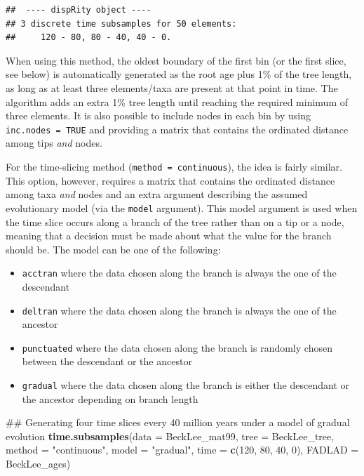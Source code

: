 \documentclass[]{book}
\newenvironment{Shaded}{\begin{snugshade}}{\end{snugshade}}
\newcommand{\KeywordTok}[1]{\textcolor[rgb]{0.13,0.29,0.53}{\textbf{#1}}}
\newcommand{\DataTypeTok}[1]{\textcolor[rgb]{0.13,0.29,0.53}{#1}}
\newcommand{\DecValTok}[1]{\textcolor[rgb]{0.00,0.00,0.81}{#1}}
\newcommand{\StringTok}[1]{\textcolor[rgb]{0.31,0.60,0.02}{#1}}
\newcommand{\NormalTok}[1]{#1}
\providecommand{\tightlist}{%
  \setlength{\itemsep}{0pt}\setlength{\parskip}{0pt}}
\theoremstyle{definition}
\theoremstyle{definition}
\theoremstyle{remark}
\begin{document}
\begin{verbatim}
##  ---- dispRity object ---- 
## 3 discrete time subsamples for 50 elements:
##     120 - 80, 80 - 40, 40 - 0.
\end{verbatim}

When using this method, the oldest boundary of the first bin (or the
first slice, see below) is automatically generated as the root age plus
1\% of the tree length, as long as at least three elements/taxa are
present at that point in time. The algorithm adds an extra 1\% tree
length until reaching the required minimum of three elements. It is also
possible to include nodes in each bin by using
\texttt{inc.nodes\ =\ TRUE} and providing a matrix that contains the
ordinated distance among tips \emph{and} nodes.

For the time-slicing method (\texttt{method\ =\ continuous}), the idea
is fairly similar. This option, however, requires a matrix that contains
the ordinated distance among taxa \emph{and} nodes and an extra argument
describing the assumed evolutionary model (via the \texttt{model}
argument). This model argument is used when the time slice occurs along
a branch of the tree rather than on a tip or a node, meaning that a
decision must be made about what the value for the branch should be. The
model can be one of the following:

\begin{itemize}
\tightlist
\item
  \texttt{acctran} where the data chosen along the branch is always the
  one of the descendant
\item
  \texttt{deltran} where the data chosen along the branch is always the
  one of the ancestor
\item
  \texttt{punctuated} where the data chosen along the branch is randomly
  chosen between the descendant or the ancestor
\item
  \texttt{gradual} where the data chosen along the branch is either the
  descendant or the ancestor depending on branch length
\end{itemize}

\begin{Shaded}
\begin{Highlighting}[]
\NormalTok{## Generating four time slices every 40 million years under a model of gradual evolution}
\KeywordTok{time.subsamples}\NormalTok{(}\DataTypeTok{data =}\NormalTok{ BeckLee_mat99, }\DataTypeTok{tree =}\NormalTok{ BeckLee_tree, }
    \DataTypeTok{method =} \StringTok{"continuous"}\NormalTok{, }\DataTypeTok{model =} \StringTok{"gradual"}\NormalTok{, }\DataTypeTok{time =} \KeywordTok{c}\NormalTok{(}\DecValTok{120}\NormalTok{, }\DecValTok{80}\NormalTok{, }\DecValTok{40}\NormalTok{, }\DecValTok{0}\NormalTok{),}
    \DataTypeTok{FADLAD =}\NormalTok{ BeckLee_ages)}
\end{Highlighting}
\end{Shaded}
\end{document}
